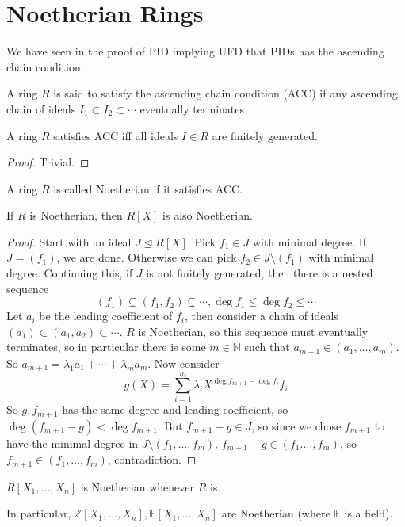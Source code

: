 \section{Noetherian Rings}
We have seen in the proof of PID implying UFD that PIDs has the ascending chain condition:
\begin{definition}
    A ring $R$ is said to satisfy the ascending chain condition (ACC) if any ascending chain of ideals $I_1\subset I_2\subset\cdots$ eventually terminates.
\end{definition}
\begin{lemma}
    A ring $R$ satisfies ACC iff all ideals $I\in R$ are finitely generated.
\end{lemma}
\begin{proof}
    Trivial.
\end{proof}
\begin{definition}
    A ring $R$ is called Noetherian if it satisfies ACC.
\end{definition}
\begin{theorem}
    If $R$ is Noetherian, then $R[X]$ is also Noetherian.
\end{theorem}
\begin{proof}
    Start with an ideal $J\unlhd R[X]$.
    Pick $f_1\in J$ with minimal degree.
    If $J=(f_1)$, we are done.
    Otherwise we can pick $f_2\in J\setminus (f_1)$ with minimal degree.
    Continuing this, if $J$ is not finitely generated, then there is a nested sequence
    $$(f_1)\subsetneq (f_1,f_2)\subsetneq\cdots, \deg f_1\le\deg f_2\le\cdots$$
    Let $a_i$ be the leading coefficient of $f_i$, then consider a chain of ideals $(a_1)\subset (a_1,a_2)\subset\cdots$.
    $R$ is Noetherian, so this sequence must eventually terminates, so in particular there is some $m\in\mathbb N$ such that $a_{m+1}\in(a_1,\ldots,a_m)$.
    So $a_{m+1}=\lambda_1a_1+\cdots+\lambda_ma_m$.
    Now consider
    $$g(X)=\sum_{i=1}^m\lambda_iX^{\deg f_{m+1}-\deg f_i}f_i$$
    So $g,f_{m+1}$ has the same degree and leading coefficient, so $\deg (f_{m+1}-g)<\deg f_{m+1}$.
    But $f_{m+1}-g\in J$, so since we chose $f_{m+1}$ to have the minimal degree in $J\setminus(f_1,\ldots,f_m)$, $f_{m+1}-g\in (f_1.\ldots,f_m)$, so $f_{m+1}\in (f_1,\ldots,f_m)$, contradiction.
\end{proof}
\begin{corollary}
    $R[X_1,\ldots,X_n]$ is Noetherian whenever $R$ is.
\end{corollary}
In particular, $\mathbb Z[X_1,\ldots,X_n],\mathbb F[X_1,\ldots,X_n]$ are Noetherian (where $\mathbb F$ is a field).
